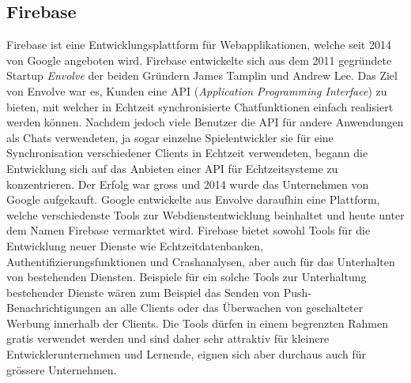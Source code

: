 \documentclass[../main.tex]{subfiles}
\begin{document}
	\subsection{Firebase} \label{DieFirebaseDatenbank}
	Firebase ist eine  Entwicklungsplattform für Webapplikationen, welche seit 2014 von Google angeboten wird. Firebase entwickelte sich aus dem 2011 gegründete Startup \emph{Envolve} der beiden Gründern James Tamplin und Andrew Lee. Das Ziel von Envolve war es, Kunden eine API (\emph{Application Programming Interface}) zu bieten, mit welcher in Echtzeit synchronisierte Chatfunktionen einfach realisiert werden können. Nachdem jedoch viele Benutzer die API für andere Anwendungen als Chats verwendeten, ja sogar einzelne Spielentwickler sie für eine Synchronisation verschiedener Clients in Echtzeit verwendeten, begann die Entwicklung sich auf das Anbieten einer API für Echtzeitsysteme zu konzentrieren. Der Erfolg war gross und 2014 wurde das Unternehmen von Google aufgekauft. Google entwickelte aus Envolve daraufhin eine Plattform, welche verschiedenste Tools zur Webdienstentwicklung beinhaltet und heute unter dem Namen Firebase vermarktet wird. Firebase bietet sowohl Tools für die Entwicklung neuer Dienste wie Echtzeitdatenbanken, Authentifizierungsfunktionen und Crashanalysen, aber auch für das Unterhalten von bestehenden Diensten. Beispiele für ein solche Tools zur Unterhaltung bestehender Dienste wären zum Beispiel das Senden von Push-Benachrichtigungen an alle Clients oder das Überwachen von geschalteter Werbung innerhalb der Clients. Die Tools dürfen in einem begrenzten Rahmen gratis verwendet werden und sind daher sehr attraktiv für kleinere Entwicklerunternehmen und Lernende, eignen sich aber durchaus auch für grössere Unternehmen. \cite{Firebase}
	
\end{document}
